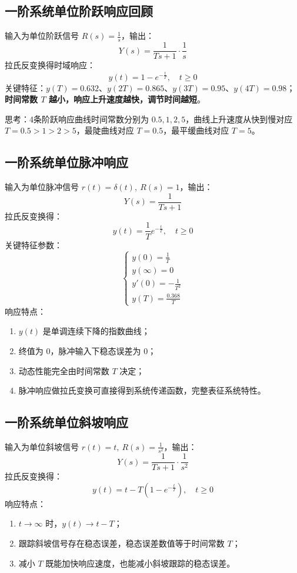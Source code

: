 \subsection{一阶系统单位阶跃响应回顾}
输入为单位阶跃信号 $R(s)=\frac{1}{s}$，输出：
\[
Y(s)=\frac{1}{Ts+1}\cdot\frac{1}{s}
\]
拉氏反变换得时域响应：
\[
y(t)=1-e^{-\frac{t}{T}},\quad t\ge 0
\]
关键特征：$y(T)=0.632$、$y(2T)=0.865$、$y(3T)=0.95$、$y(4T)=0.98$；\textbf{时间常数 $T$ 越小，响应上升速度越快，调节时间越短}。

思考：4条阶跃响应曲线时间常数分别为 $0.5,1,2,5$，曲线上升速度从快到慢对应 $T=0.5>1>2>5$，最陡曲线对应 $T=0.5$，最平缓曲线对应 $T=5$。

\subsection{一阶系统单位脉冲响应}
输入为单位脉冲信号 $r(t)=\delta(t),\ R(s)=1$，输出：
\[
Y(s)=\frac{1}{Ts+1}
\]
拉氏反变换得：
\[
y(t)=\frac{1}{T}e^{-\frac{t}{T}},\quad t\ge 0
\]
关键特征参数：
\[
\begin{cases}
y(0)=\displaystyle\frac{1}{T}\\
y(\infty)=0\\
y'(0)=-\displaystyle\frac{1}{T^2}\\
y(T)=\displaystyle\frac{0.368}{T}
\end{cases}
\]
响应特点：
\begin{enumerate}
    \item $y(t)$ 是单调连续下降的指数曲线；
    \item 终值为 $0$，脉冲输入下稳态误差为 $0$；
    \item 动态性能完全由时间常数 $T$ 决定；
    \item 脉冲响应做拉氏变换可直接得到系统传递函数，完整表征系统特性。
\end{enumerate}

\subsection{一阶系统单位斜坡响应}
输入为单位斜坡信号 $r(t)=t,\ R(s)=\frac{1}{s^2}$，输出：
\[
Y(s)=\frac{1}{Ts+1}\cdot\frac{1}{s^2}
\]
拉氏反变换得：
\[
y(t)=t-T\left(1-e^{-\frac{t}{T}}\right),\quad t\ge 0
\]
响应特点：
\begin{enumerate}
    \item $t\to\infty$ 时，$y(t)\to t-T$；
    \item 跟踪斜坡信号存在稳态误差，稳态误差数值等于时间常数 $T$；
    \item 减小 $T$ 既能加快响应速度，也能减小斜坡跟踪的稳态误差。
\end{enumerate}


